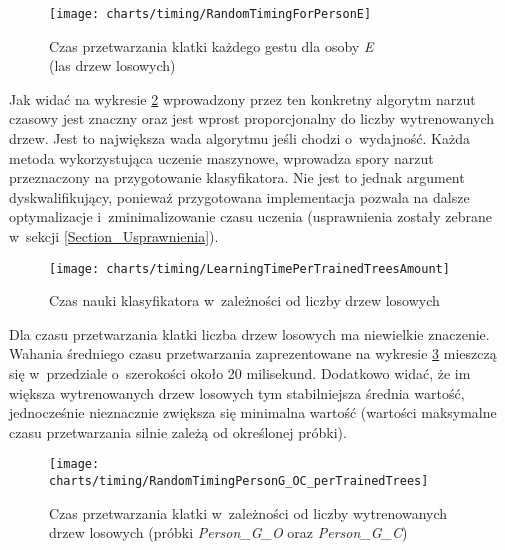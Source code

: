       \begin{figure}[!ht]
        \centering
        \texttt{[image: charts/timing/RandomTimingForPersonE]}
        \caption[Czas przetwarzania klatki każdego gestu dla osoby E (las drzew losowych)]
                {Czas przetwarzania klatki każdego gestu dla osoby \textit{E}\\(las drzew losowych)}
        \label{fig:RandomTimingForPersonE}
      \end{figure}

    \newpage
    Jak widać na wykresie \ref{fig:LearningTime} wprowadzony przez ten konkretny algorytm narzut czasowy jest znaczny oraz jest wprost proporcjonalny do liczby wytrenowanych drzew. Jest to największa wada algorytmu jeśli chodzi o~wydajność. Każda metoda wykorzystująca uczenie maszynowe, wprowadza spory narzut przeznaczony na przygotowanie klasyfikatora. Nie jest to jednak argument dyskwalifikujący, ponieważ przygotowana implementacja pozwala na dalsze optymalizacje i~zminimalizowanie czasu uczenia (usprawnienia zostały zebrane w~sekcji \ref{Section_Usprawnienia}).

      \begin{figure}[!ht]
        \centering
        \texttt{[image: charts/timing/LearningTimePerTrainedTreesAmount]}
        \caption[Czas nauki klasyfikatora w~zależności od liczby drzew losowych]
                {Czas nauki klasyfikatora w~zależności od liczby drzew losowych}
        \label{fig:LearningTime}
      \end{figure}

    Dla czasu przetwarzania klatki liczba drzew losowych ma niewielkie znaczenie. Wahania średniego czasu przetwarzania zaprezentowane na wykresie \ref{fig:TimingPerTrainedTreesAmount} mieszczą się w~przedziale o~szerokości około 20 milisekund. Dodatkowo widać, że im większa wytrenowanych drzew losowych tym stabilniejsza średnia wartość, jednocześnie nieznacznie zwiększa się minimalna wartość (wartości maksymalne czasu przetwarzania silnie zależą od określonej próbki).

      \begin{figure}[!ht]
        \centering
        \texttt{[image: charts/timing/RandomTimingPersonG\_OC\_perTrainedTrees]}
        \caption[Czas przetwarzania klatki w~zależności od liczby wytrenowanych drzew losowych]
                {Czas przetwarzania klatki w~zależności od liczby wytrenowanych drzew losowych (próbki \textit{Person\_G\_O} oraz \textit{Person\_G\_C})}
        \label{fig:TimingPerTrainedTreesAmount}
      \end{figure}

